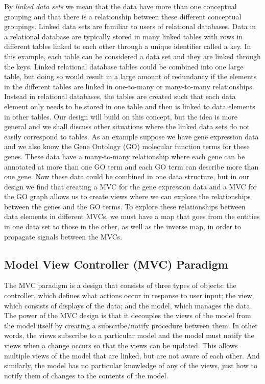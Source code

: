 \documentclass[11pt]{article}
\begin{document}
By \textit{linked data sets} we mean that the data have more than one
conceptual grouping and that there is a relationship between these
different conceptual groupings.  Linked data sets are 
familiar to users of relational databases.  Data in a relational
database are typically stored in many linked tables with rows in
different tables linked to each other through a unique identifier
called a key.  In this example, each table can be considered a data set
and they are linked through the keys. 
Linked relational database tables could be combined into one
large table, but doing so would result in a large amount of redundancy if
the elements in the different tables are linked in one-to-many or many-to-many
relationships.  Instead in relational databases, the tables are created such
that each data element only needs to be stored in one table and then is linked
to data elements in other tables.  Our design will build on this
concept, but the idea is more general and we shall discuss other situations
where the linked data sets do not easily correspond to tables.  As an example
suppose we have gene expression data and we
also know the Gene Ontology (GO) molecular function terms for these genes. 
These data have a many-to-many relationship where each gene can be
annotated at more than one GO term and each GO term can describe more than one
gene.  Now these data could be combined in one data structure, but in
our design we find that creating a MVC for the gene expression data and a MVC
for the GO graph allows us to create views where we can explore the
relationships between the genes and the GO terms.  To explore these
relationships between data elements in different MVCs, we
must have a map that goes from the entities in one data set to those in the
other, as well as the inverse map, in order to propagate signals between the
MVCs.  

\subsection{Model View Controller (MVC) Paradigm}
\label{Ssec:MVC}

The MVC paradigm \citep{DesignPatterns} is a design that consists of
three types of objects: the controller, which defines what actions
occur in response to user input; the view, which consists of displays
of the data; and the model, which manages the data.  The power of the
MVC design is that it decouples the views of the model from the model
itself by creating a subscribe/notify procedure between them. In other
words, the views subscribe to a particular model and the model must
notify the views when a change occurs so that the views can be
updated.  This allows multiple views of the model that are linked, but
are not aware of each other.  And similarly, the model has no
particular knowledge of any of the views, just how to notify them of
changes to the contents of the model.   
\end{document}
